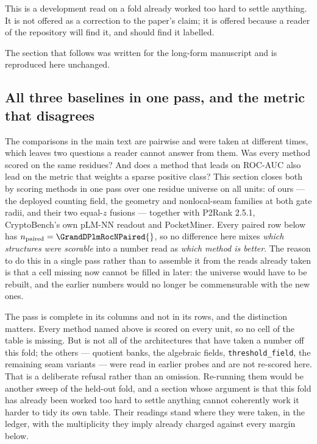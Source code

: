 This is a development read on a fold already worked too hard to settle
anything. It is not offered as a correction to the paper's claim; it is offered
because a reader of the repository will find it, and should find it labelled.

The section that follows was written for the long-form manuscript and is
reproduced here unchanged.

\subsection*{All three baselines in one pass, and the metric that disagrees}
\label{sec:grand}
The comparisons in the main text are pairwise and were taken at different times,
which leaves two questions a reader cannot answer from them. Was every method
scored on the same residues? And does a method that leads on ROC-AUC also lead
on the metric that weights a sparse positive class? This section closes both by
scoring \GrandNMethods{} methods in one pass over one residue universe on all
\GrandN{} units: \GrandNOurs{} of ours --- the deployed counting field, the
geometry and nonlocal-seam families at both gate radii, and their two equal-$z$
fusions --- together with P2Rank 2.5.1, CryptoBench's own pLM-NN readout and
PocketMiner. Every paired row below has
$n_{\text{paired}} = \GrandDPlmRocNPaired{}$, so no difference here
mixes \emph{which structures were scorable} into a number read as \emph{which
method is better}. The reason to do this in a single pass rather than to
assemble it from the reads already taken is that a cell missing now cannot be
filled in later: the universe would have to be rebuilt, and the earlier numbers
would no longer be commensurable with the new ones.

The pass is complete in its columns and not in its rows, and the distinction
matters. Every method named above is scored on every unit, so no cell of the
table is missing. But \GrandNOurs{} is not all \NArchOnFold{} of the
architectures that have taken a number off this fold; the others --- quotient
banks, the algebraic fields, \texttt{threshold\_field}, the remaining seam
variants --- were read in earlier probes and are not re-scored here. That is a
deliberate refusal rather than an omission. Re-running them would be another
sweep of the held-out fold, and a section whose argument is that this fold has
already been worked too hard to settle anything cannot coherently work it
harder to tidy its own table. Their readings stand where they were taken, in
the ledger, with the multiplicity they imply already charged against every
margin below.


